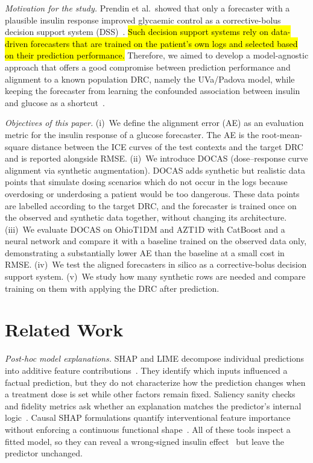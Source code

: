 \documentclass[a4paper,fleqn]{cas-sc}
\begin{document}
\noindent\textit{Motivation for the study.}
Prendin et al.\ showed that only a forecaster with a plausible insulin response
improved glycaemic control as a corrective-bolus decision support system
(DSS)~\citep{prendin2023}. \hl{Such decision support systems rely on data-driven forecasters that are trained on
the patient's own logs and selected based on their prediction performance.}
Therefore, we aimed to develop a model-agnostic approach that offers a good
compromise between prediction performance and alignment to a known population
DRC, namely the UVa/Padova model, while keeping the forecaster from learning the
confounded association between insulin and glucose as a
shortcut~\citep{geirhos2020}.

\noindent\textit{Objectives of this paper.}
(i)~We define the alignment error (AE) as an evaluation metric for the insulin
response of a glucose forecaster. The AE is the root-mean-square distance
between the ICE curves of the test contexts and the target DRC and is reported
alongside RMSE.
(ii)~We introduce DOCAS (dose--response curve alignment via synthetic
augmentation). DOCAS adds synthetic but realistic data points that simulate
dosing scenarios which do not occur in the logs because overdosing or
underdosing a patient would be too dangerous. These data points are labelled
according to the target DRC, and the forecaster is trained once on the observed
and synthetic data together, without changing its architecture.
(iii)~We evaluate DOCAS on OhioT1DM and AZT1D with CatBoost and a neural network
and compare it with a baseline trained on the observed data only, demonstrating
a substantially lower AE than the baseline at a small cost in RMSE.
(iv)~We test the aligned forecasters in silico as a corrective-bolus decision
support system.
(v)~We study how many synthetic rows are needed and compare training on them
with applying the DRC after prediction.

\section{Related Work}\label{sec:related}

\noindent\textit{Post-hoc model explanations.}
SHAP and LIME decompose individual predictions into additive feature
contributions~\citep{lundberg2017,ribeiro2016}. They identify which inputs
influenced a factual prediction, but they do not characterize how the prediction
changes when a treatment dose is set while other factors remain fixed. Saliency
sanity checks and fidelity metrics ask whether an explanation matches the
predictor's internal logic~\citep{yeh2019,adebayo2018,samek2017,nauta2023}. Causal
SHAP formulations quantify interventional feature importance without enforcing a
continuous functional shape~\citep{jung2022doshapley,heskes2020causalshap,pearl2019tools}.
All of these tools inspect a fitted model, so they can reveal a wrong-signed
insulin effect~\citep{prendin2023,geirhos2020,lapuschkin2019} but leave the
predictor unchanged.
\end{document}
